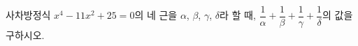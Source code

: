 사차방정식 $x^4-11x^2+25=0$의 네 근을 $\alpha$, $\beta$, $\gamma$, $\delta$라 할 때, $\dfrac{1}{\alpha}+\dfrac{1}{\beta}+\dfrac{1}{\gamma}+\dfrac{1}{\delta}$의 값을 구하시오.
